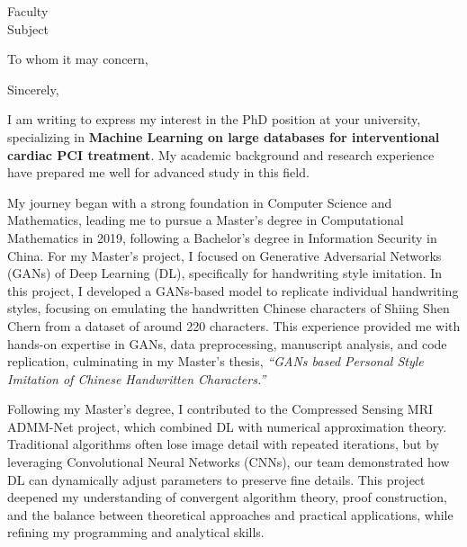 \documentclass[11pt,a4paper, final]{moderncv}
\newcommand{\spacesubsection}{\vspace{0.2cm}}
\begin{document}
% 
\renewcommand{\refname}{Publications} 
{Faculty\\
Subject}
\date{\today}
\opening{To whom it may concern,}
\closing{Sincerely,}
\makelettertitle
\thispagestyle{empty}
\pagestyle{empty}
I am writing to express my interest in the PhD position at your university, 
specializing in \textbf{Machine Learning on large databases for interventional cardiac PCI treatment}. 
My academic background and research experience have prepared me well for advanced study in this field. 

My journey began with a strong foundation in Computer Science and Mathematics, 
leading me to pursue a Master's degree in Computational Mathematics in 2019, 
following a Bachelor's degree in Information Security in China. 
For my Master's project, I focused on Generative Adversarial Networks (GANs) of Deep Learning (DL), 
specifically for handwriting style imitation. 
In this project, I developed a GANs-based model to replicate individual handwriting styles, 
focusing on emulating the handwritten Chinese characters of Shiing Shen Chern from a dataset of around 220 characters. 
This experience provided me with hands-on expertise in GANs, 
data preprocessing, manuscript analysis, and code replication, 
culminating in my Master's thesis, \emph{``GANs based Personal Style Imitation of Chinese Handwritten Characters.''}

Following my Master's degree, 
I contributed to the Compressed Sensing MRI ADMM-Net project, 
which combined DL with numerical approximation theory. 
Traditional algorithms often lose image detail with repeated iterations, 
but by leveraging Convolutional Neural Networks (CNNs), 
our team demonstrated how DL can dynamically adjust parameters to preserve fine details. 
This project deepened my understanding of convergent algorithm theory, proof construction, 
and the balance between theoretical approaches and practical applications, 
while refining my programming and analytical skills.
\end{document}
